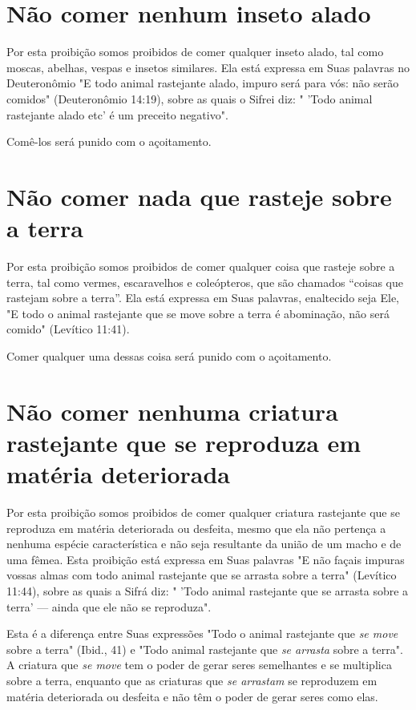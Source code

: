 \section{Não comer nenhum inseto alado}

Por esta proibição somos proibidos de comer qualquer inseto ala­do, tal
como moscas, abelhas, vespas e insetos similares. Ela está expressa em
Suas palavras no Deuteronômio "E todo animal rastejante alado, impuro
será para vós: não serão comidos" (Deuteronômio 14:19), sobre as quais o
Sifrei diz: " 'Todo animal rastejante alado etc' é um preceito
negativo".

Comê-los será punido com o açoitamento.

\section{Não comer nada que rasteje sobre a terra}

Por esta proibição somos proibidos de comer qualquer coisa que ras­teje
sobre a terra, tal como vermes, escaravelhos e coleópteros, que são
chama­dos ``coisas que rastejam sobre a terra''. Ela está expressa em Suas
palavras, enal­tecido seja Ele, "E todo o animal rastejante que se move
sobre a terra é abomi­nação, não será comido" (Levítico 11:41).


Comer qualquer uma dessas coisa será punido com o açoitamento.



\section{Não comer nenhuma criatura rastejante que se reproduza em matéria deteriorada}

Por esta proibição somos proibidos de comer qualquer criatura
ras­tejante que se reproduza em matéria deteriorada ou desfeita, mesmo
que ela não pertença a nenhuma espécie característica e não seja
resultante da união de um macho e de uma fêmea. Esta proibição está
expressa em Suas palavras "E não façais impuras vossas 
almas com todo animal rastejante que se
arrasta sobre a terra" (Levítico 11:44), sobre as quais a Sifrá diz: "
'Todo animal raste­jante que se arrasta sobre a terra' --- ainda que ele
não se reproduza".

Esta é a diferença entre Suas expressões "Todo o animal rastejante que
\emph{se move} sobre a terra" (Ibid., 41) e "Todo animal rastejante que
\emph{se arrasta} sobre a terra". A criatura que \emph{se move} tem o
poder de gerar seres semelhantes e se multiplica sobre a terra, enquanto
que as criaturas que \emph{se arrastam} se re­produzem em matéria
deteriorada ou desfeita e não têm o poder de gerar seres como elas.


